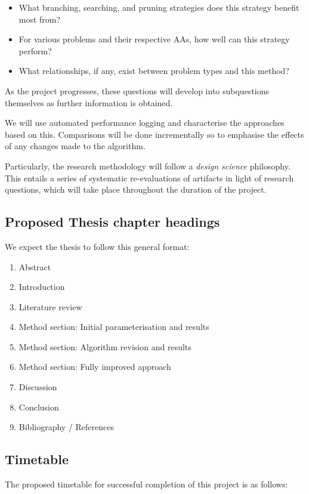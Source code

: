 \documentclass[12pt, a4paper]{article}
\begin{document}
\begin{itemize}
\item What branching, searching, and pruning strategies does this strategy benefit most from?
\item For various problems and their respective AAs, how well can this strategy perform?
\item What relationships, if any, exist between problem types and this method?
\end{itemize}

As the project progresses, these questions will develop into subquestions themselves as further information is obtained.

We will use automated performance logging and characterise the approaches based on this. Comparisons will be done incrementally so to emphasise the effects of any changes made to the algorithm.

Particularly, the research methodology will follow a \textit{design science} philosophy. This entails a series of systematic re-evaluations of artifacts in light of research questions, which will take place throughout the duration of the project. 

\subsection{Proposed Thesis chapter headings}
We expect the thesis to follow this general format:
\begin{enumerate}
  \item Abstract
  \item Introduction
  \item Literature review
  \item Method section: Initial parameterisation and results
  \item Method section: Algorithm revision and results 
  \item Method section: Fully improved approach
  \item Discussion
  \item Conclusion
  \item Bibliography / References
\end{enumerate}
\subsection{Timetable}
The proposed timetable for successful completion of this project is as follows:
\end{document}
